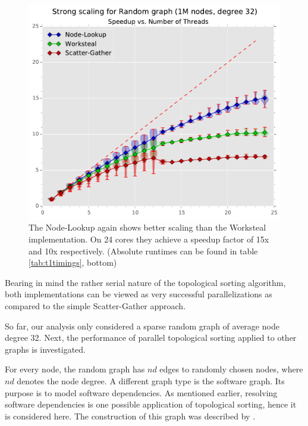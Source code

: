 \begin{figure}[ht]
	\centering
	\includegraphics[width=\columnwidth]{plots/strongscaling_gtRANDOMLIN_n1000000_deg32.pdf}
	\caption{The Node-Lookup again shows better scaling than the Worksteal implementation. On 24 cores they achieve a speedup factor of 15x and 10x respectively. (Absolute runtimes can be found in table \ref{tab:t1timings}, bottom)}
	\label{fig:strongscaling}
\end{figure}
%
Bearing in mind the rather serial nature of the topological sorting algorithm, both implementations can be viewed as very successful parallelizations as compared to the simple Scatter-Gather approach.



 So far, our analysis only considered a sparse random graph of average node degree 32.
Next, the performance of parallel topological sorting applied to other graphs is investigated.

For every node, the random graph has $nd$ edges to randomly chosen nodes, where $nd$ denotes the node degree.
A different graph type is the software graph. Its purpose is to model software dependencies. 
As mentioned earlier, resolving software dependencies is one possible application of topological sorting, hence it is considered here.
The construction of this graph was described by \cite{musco2014generative}.

